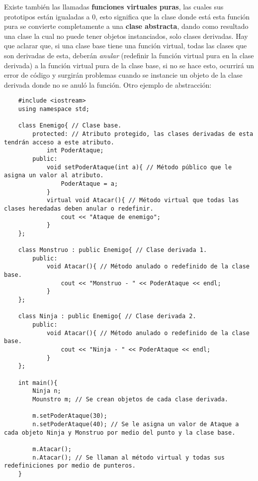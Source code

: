 Existe también las llamadas \textbf{funciones virtuales puras}, las cuales sus prototipos están igualadas a 0, esto significa que la clase donde está esta función pura se convierte completamente a una \textbf{clase abstracta}, dando como resultado una clase la cual no puede tener objetos instanciados, solo clases derivadas. Hay que aclarar que, si una clase base tiene una función virtual, todas las clases que son derivadas de esta, deberán \textit{anular} (redefinir la función virtual pura en la clase derivada) a la función virtual pura de la clase base, si no se hace esto, ocurrirá un error de código y surgirán problemas cuando se instancie un objeto de la clase derivada donde no se anuló la función. Otro ejemplo de abstracción:
\begin{lstlisting}
    #include <iostream>
    using namespace std;
    
    class Enemigo{ // Clase base.
        protected: // Atributo protegido, las clases derivadas de esta tendrán acceso a este atributo.
            int PoderAtaque;
        public:
            void setPoderAtaque(int a){ // Método público que le asigna un valor al atributo.
                PoderAtaque = a;
            }
            virtual void Atacar(){ // Método virtual que todas las clases heredadas deben anular o redefinir.
                cout << "Ataque de enemigo";
            }
    };
    
    class Monstruo : public Enemigo{ // Clase derivada 1.
        public:
            void Atacar(){ // Método anulado o redefinido de la clase base.
                cout << "Monstruo - " << PoderAtaque << endl;
            }
    };
    
    class Ninja : public Enemigo{ // Clase derivada 2.
        public:
            void Atacar(){ // Método anulado o redefinido de la clase base.
                cout << "Ninja - " << PoderAtaque << endl;
            }
    };
    
    int main(){
        Ninja n;
        Mounstro m; // Se crean objetos de cada clase derivada.
        
        m.setPoderAtaque(30);
        n.setPoderAtaque(40); // Se le asigna un valor de Ataque a cada objeto Ninja y Monstruo por medio del punto y la clase base.
        
        m.Atacar();
        n.Atacar(); // Se llaman al método virtual y todas sus redefiniciones por medio de punteros.
    }
\end{lstlisting}
